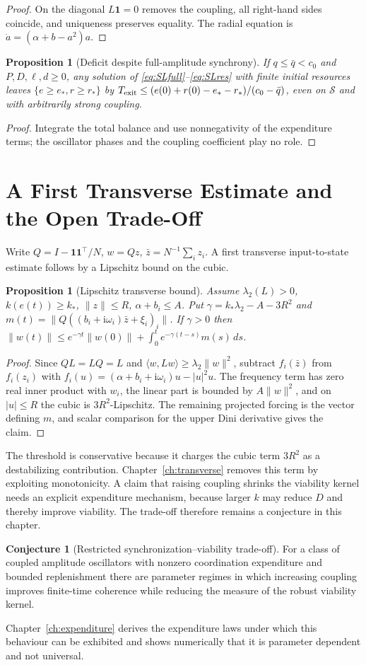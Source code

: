 \documentclass[11pt,notitlepage]{report}
\newtheorem{proposition}[theorem]{Proposition}
\theoremstyle{definition}
\newtheorem{conjecture}[theorem]{Conjecture}
\theoremstyle{remark}
\newcommand{\ii}{\mathrm i}
\newcommand{\one}{\mathbf 1}
\begin{document}
\begin{proof}
On the diagonal $L\one=0$ removes the coupling, all right-hand sides coincide, and uniqueness preserves equality. The radial equation is $\dot a=(\alpha+b-a^2)a$.
\end{proof}
\begin{proposition}[Deficit despite full-amplitude synchrony]\label{prop:SLdeficit}
If $q\le\bar q<c_0$ and $P,D,\ell,d\ge0$, any solution of \eqref{eq:SLfull}--\eqref{eq:SLres} with finite initial resources leaves $\{e\ge e_*,r\ge r_*\}$ by $T_{\rm exit}\le(e(0)+r(0)-e_*-r_*)/(c_0-\bar q)$, even on $\mathcal S$ and with arbitrarily strong coupling.
\end{proposition}
\begin{proof}
Integrate the total balance and use nonnegativity of the expenditure terms; the oscillator phases and the coupling coefficient play no role.
\end{proof}

\section{A First Transverse Estimate and the Open Trade-Off}
Write $Q=I-\one\one^\top/N$, $w=Qz$, $\bar z=N^{-1}\sum_iz_i$. A first transverse input-to-state estimate follows by a Lipschitz bound on the cubic.
\begin{proposition}[Lipschitz transverse bound]\label{prop:transverse}
Assume $\lambda_2(L)>0$, $k(e(t))\ge k_*$, $\|z\|\le R$, $\alpha+b_i\le A$. Put $\gamma=k_*\lambda_2-A-3R^2$ and $m(t)=\|Q((b_i+\ii\omega_i)\bar z+\xi_i)_i\|$. If $\gamma>0$ then $\|w(t)\|\le e^{-\gamma t}\|w(0)\|+\int_0^te^{-\gamma(t-s)}m(s)\,ds$.
\end{proposition}
\begin{proof}
Since $QL=LQ=L$ and $\langle w,Lw\rangle\ge\lambda_2\|w\|^2$, subtract $f_i(\bar z)$ from $f_i(z_i)$ with $f_i(u)=(\alpha+b_i+\ii\omega_i)u-|u|^2u$. The frequency term has zero real inner product with $w_i$, the linear part is bounded by $A\|w\|^2$, and on $|u|\le R$ the cubic is $3R^2$-Lipschitz. The remaining projected forcing is the vector defining $m$, and scalar comparison for the upper Dini derivative gives the claim.
\end{proof}
The threshold is conservative because it charges the cubic term $3R^2$ as a destabilizing contribution. Chapter~\ref{ch:transverse} removes this term by exploiting monotonicity. A claim that raising coupling shrinks the viability kernel needs an explicit expenditure mechanism, because larger $k$ may reduce $D$ and thereby improve viability. The trade-off therefore remains a conjecture in this chapter.
\begin{conjecture}[Restricted synchronization--viability trade-off]
For a class of coupled amplitude oscillators with nonzero coordination expenditure and bounded replenishment there are parameter regimes in which increasing coupling improves finite-time coherence while reducing the measure of the robust viability kernel.
\end{conjecture}
Chapter~\ref{ch:expenditure} derives the expenditure laws under which this behaviour can be exhibited and shows numerically that it is parameter dependent and not universal.
\end{document}
